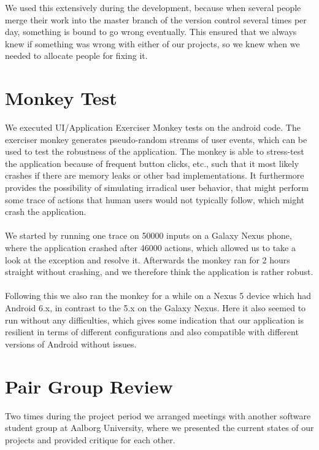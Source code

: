 We used this extensively during the development, because when several people merge their work into the master branch of the version control several times per day, something is bound to go wrong eventually. This ensured that we always knew if something was wrong with either of our projects, so we knew when we needed to allocate people for fixing it. 

\section{Monkey Test}
\label{sec:monkey_test}
We executed UI/Application Exerciser Monkey tests on the android code. The exerciser monkey generates pseudo-random streams of user events, which can be used to test the robustness of the application. The monkey is able to stress-test the application because of frequent button clicks, etc., such that it most likely crashes if there are memory leaks or other bad implementations. It furthermore provides the possibility of simulating irradical user behavior, that might perform some trace of actions that human users would not typically follow, which might crash the application. 
\\\\
We started by running one trace on 50000 inputs on a Galaxy Nexus phone, where the application crashed after 46000 actions, which allowed us to take a look at the exception and resolve it. Afterwards the monkey ran for 2 hours straight without crashing, and we therefore think the application is rather robust.
\\\\
Following this we also ran the monkey for a while on a Nexus 5 device which had Android 6.x, in contrast to the 5.x on the Galaxy Nexus. Here it also seemed to run without any difficulties, which gives some indication that our application is resilient in terms of different configurations and also compatible with different versions of Android without issues.

\section{Pair Group Review}
\label{sec:pair_group_review}

Two times during the project period we arranged meetings with another software student group at Aalborg University, where we presented the current states of our projects and provided critique for each other. 
\\\\
